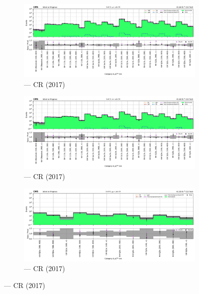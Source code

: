 \begin{figure}[htbp]
    \centering
    \begin{subfigure}[b]{0.66\textwidth}
        \includegraphics[width=\textwidth]{chapters/higgstoinv/figures/mountain_ranges/2017/ttH/Wmunu_tree_fit_s-abs_values_ttH_cats.pdf}
        \caption{\ttH --- \singleMuCr \gls{CR} (2017)}
    \end{subfigure}

    \begin{subfigure}[b]{0.66\textwidth}
        \includegraphics[width=\textwidth]{chapters/higgstoinv/figures/mountain_ranges/2017/ttH/Wenu_tree_fit_s-abs_values_ttH_cats.pdf}
        \caption{\ttH --- \singleEleCr \gls{CR} (2017)}
    \end{subfigure}

    \begin{subfigure}[b]{0.66\textwidth}
        \includegraphics[width=\textwidth]{chapters/higgstoinv/figures/mountain_ranges/2017/ttH/Zmumu_tree_fit_s-abs_values_ttH_cats.pdf}
        \caption{\ttH --- \doubleMuCr \gls{CR} (2017)}
    \end{subfigure}


\end{figure}
